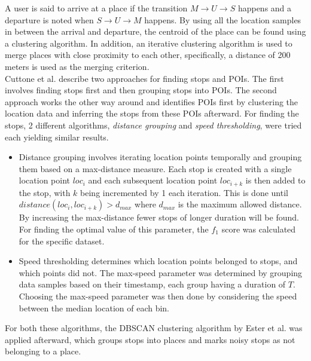 A user is said to arrive at a place if the transition $M \rightarrow U \rightarrow S$ happens and a departure is noted when $S \rightarrow U \rightarrow M$ happens. By using all the location samples in between the arrival and departure, the centroid of the place can be found using a clustering algorithm. In addition, an iterative clustering algorithm is used to merge places with close proximity to each other, specifically, a distance of 200 meters is used as the merging criterion. \\ 


Cuttone et al. describe two approaches for finding stops and POIs. The first involves finding stops first and then grouping stops into POIs. The second approach works the other way around and identifies POIs first by clustering the location data and inferring the stops from these POIs afterward. For finding the stops, 2 different algorithms, \textit{distance grouping} and \textit{speed thresholding}, were tried each yielding similar results.

\begin{itemize}
    \item Distance grouping involves iterating location points temporally and grouping them based on a max-distance measure. Each stop is created with a single location point $loc_{i}$ and each subsequent location point $loc_{i+k}$ is then added to the stop, with $k$ being incremented by 1 each iteration. This is done until $distance(loc_{i}, loc_{i+k}) > d_{max}$ where $d_{max}$ is the maximum allowed distance. By increasing the max-distance fewer stops of longer duration will be found. For finding the optimal value of this parameter, the $f_1$ score was calculated for the specific dataset.  

    \item Speed thresholding determines which location points belonged to stops, and which points did not. The max-speed parameter was determined by grouping data samples based on their timestamp, each group having a duration of $T$. Choosing the max-speed parameter was then done by considering the speed between the median location of each bin.  
\end{itemize}

For both these algorithms, the DBSCAN clustering algorithm by Ester et al. \cite{density-based-1996} was applied afterward, which groups stops into places and marks noisy stops as not belonging to a place.\\

